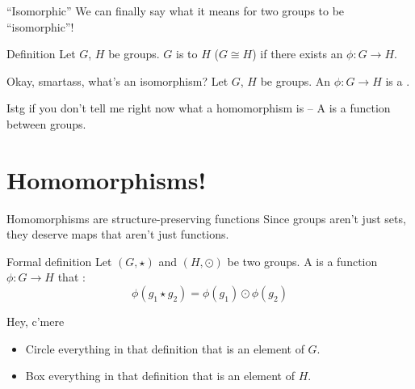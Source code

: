 \documentclass[8pt, handout]{beamer}
\begin{document}
\begin{frame}{``Isomorphic''}
  We can finally say what it means for two groups to be ``isomorphic''! \pause
  \begin{block}{Definition}
    Let $G$, $H$ be groups. $G$ is  to $H$ ($G\cong H$) if there exists an  $\phi: G\to H$.
  \end{block} \pause 

  \begin{block}{Okay, smartass, what's an isomorphism?} \pause
    Let $G$, $H$ be groups. An  $\phi: G \to H$ is a  .
  \end{block} \pause

  \begin{exampleblock}{Istg if you don't tell me right now what a homomorphism is --} \pause
    A  is a  function between groups.
  \end{exampleblock}
\end{frame}

\section{Homomorphisms!}

\begin{frame}{Homomorphisms are structure-preserving functions}
  Since groups aren't just sets, they deserve maps that aren't just functions. \pause

  \begin{block}{Formal definition}
    Let $(G, \star)$ and $(H, \odot)$ be two groups. A  is a function $\phi: G\to H$ that :
    \[\phi(g_1 \star g_2) = \phi(g_1) \odot \phi(g_2)\]
  \end{block} \pause
  \begin{alertblock}{Hey, c'mere} \pause
    \begin{itemize}
      \item Circle everything in that definition that is an element of $G$. \pause
      \item Box everything in that definition that is an element of $H$.
    \end{itemize}
  \end{alertblock}
\end{frame}
\end{document}
